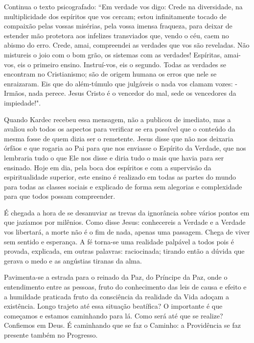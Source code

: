 \emdash{}Continua o texto psicografado: ``Em verdade vos digo: Crede na diversidade, na multiplicidade dos espíritos que vos cercam; estou infinitamente tocado de compaixão pelas vossas misérias, pela vossa imensa fraqueza, para deixar de estender mão protetora aos infelizes transviados que, vendo o céu, caem no abismo do erro. Crede, amai, compreendei as verdades que vos são reveladas. Não mistureis o joio com o bom grão, os sistemas com as verdades! Espíritas, amai-vos, eis o primeiro ensino. Instruí-vos, eis o segundo. Todas as verdades se encontram no Cristianismo; são de origem humana os erros que nele se enraizaram. Eis que do além-túmulo que julgáveis o nada vos clamam vozes: - Irmãos, nada perece. Jesus Cristo é o vencedor do mal, sede os vencedores da impiedade!".

\emdash{}Quando Kardec recebeu essa mensagem, não a publicou de imediato, mas a avaliou sob todos os aspectos para verificar se era possível que o conteúdo da mesma fosse de quem dizia ser o remetente. Jesus disse que não nos deixaria órfãos e que rogaria ao Pai para que nos enviasse o Espírito da Verdade, que nos lembraria tudo o que Ele nos disse e diria tudo o mais que havia para ser ensinado. Hoje em dia, pela boca dos espíritos e com a supervisão da espiritualidade superior, este ensino é realizado em todas as partes do mundo para todas as classes sociais e explicado de forma sem alegorias e complexidade para que todos possam compreender.

\emdash{}É chegada a hora de se desanuviar as trevas da ignorância sobre vários pontos em que jazíamos por milênios. Como disse Jesus: conhecereis a Verdade e a Verdade vos libertará, a morte não é o fim de nada, apenas uma passagem. Chega de viver sem sentido e esperança. A fé torna-se uma realidade palpável a todos pois é provada, explicada, em outras palavras: raciocinada; tirando então a dúvida que gerava o medo e as angústias tiranas da alma.

\emdash{}Pavimenta-se a estrada para o reinado da Paz, do Príncipe da Paz, onde o entendimento entre as pessoas, fruto do conhecimento das leis de causa e efeito e a humildade praticada fruto da consciência da realidade da Vida adoçam a existência. Longo trajeto até essa situação beatífica? O importante é que começamos e estamos caminhando para lá. Como será até que se realize? Confiemos em Deus. É caminhando que se faz o Caminho: a Providência se faz presente também no Progresso.